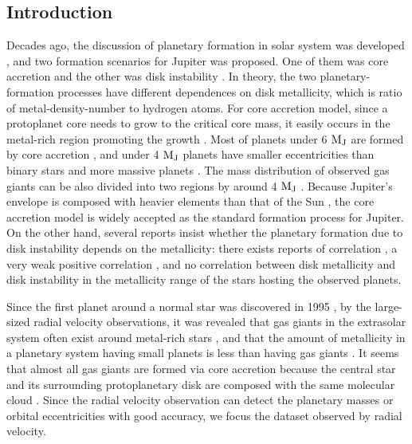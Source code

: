 \documentclass[twocolumn, dvipdfmx]{aastex62}
\begin{document}
\begin{CJK*}{UTF8}{min}
\vspace{1cm}



\section{Introduction} \label{sec:introduction}

Decades ago, the discussion of planetary formation in solar system was developed \citep{1985Arizona}, and two formation scenarios for Jupiter was proposed. One of them was core accretion \citep{1974Icar...22..416P, 1980PThPh..64..544M, 1996Icar..124...62P} and the other was disk instability \citep{1951PNAS...37....1K, 1997Sci...276.1836B, 2002Sci...298.1756M}. In theory, the two planetary-formation processes have different dependences on disk metallicity, which is ratio of metal-density-number to hydrogen atoms. For core accretion model, since a protoplanet core needs to grow to the critical core mass, it easily occurs in the metal-rich region promoting the growth \citep{2004ApJ...616..567I, 2012A&A...541A..97M}. Most of planets under 6 $\rm M_J$ are formed by core accretion \citep{2007ApJ...662.1282M}, and under 4 $\rm M_J$ planets have smaller eccentricities than binary stars and more massive planets \citep{2007A&A...464..779R}. The mass distribution of observed gas giants can be also divided into two regions by around 4 $\rm M_J$ \citep{2017A&A...603A..30S}. Because Jupiter's envelope is composed with heavier elements than that of the Sun \citep{2003NewAR..47....1Y}, the core accretion model is widely accepted as the standard formation process for Jupiter. On the other hand, several reports insist whether the planetary formation due to disk instability depends on the metallicity: there exists reports of correlation \citep{2006ApJ...636L.149C, 2007Arizona}, a very weak positive correlation \citep{2007ApJ...661L..77M}, and no correlation \citep{2002ApJ...567L.149B} between disk metallicity and disk instability in the metallicity range of the stars hosting the observed planets. 

Since the first planet around a normal star was discovered in 1995
\citep{1995Natur.378..355M}, by the large-sized radial velocity observations, it was revealed that gas giants in the extrasolar system often exist around metal-rich stars \citep{2003A&A...398..363S, 2005ApJ...622.1102F}, and that the amount of metallicity in a planetary system having small planets is less than having gas giants \citep{2011arXiv1109.2497M, 2015AJ....149...14W}. It seems that almost all gas giants are formed via core accretion because the central star and its surrounding protoplanetary disk are composed with the same molecular cloud \citep{2004ApJ...616..567I, 2012A&A...541A..97M}. Since the radial velocity observation can detect the planetary masses or orbital eccentricities with good accuracy, we focus the dataset observed by radial velocity.


\end{CJK*}
\end{document}
